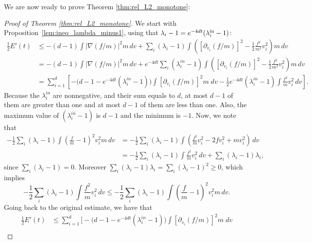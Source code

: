 \documentclass[11pt]{amsart}
\numberwithin{equation}{section}
\begin{document}
We are now ready to prove Theorem \ref{thm:rel_L2_monotone}: 

% 
\begin{proof}[Proof of Theorem \ref{thm:rel_L2_monotone}]
  We start with Proposition~\ref{lem:ineq_lambda_minus1}, using that $ \lambda_i-1 =e^{-4dt}(\lambda_i^\textnormal{in}-1)$:
  \begin{align*}
    \frac{1}{2}E'(t) & \leq
    -(d-1)\int\vert\nabla\left(f/ m \right)\vert^{2} m\,dv + 
    \sum_{i}(\lambda_{i}-1)\int\left(\left[\partial_{v_{i}}(f/ m )\right]^{2}-\frac{1}{2}\frac{f^{2}}{ m ^{2}}v_{i}^{2}\right) m\,dv\\
    & =  -(d-1)\int\vert\nabla\left(f/ m \right)\vert^{2} m\,dv + 
    e^{-4dt}\sum_{i}(\lambda_{i}^{in}-1)\int\left(\left[\partial_{v_{i}}(f/ m )\right]^{2}-\frac{1}{2}\frac{f^{2}}{ m ^{2}}v_{i}^{2}\right) m\,dv \\
     &=  \sum_{i=1}^d \left[ - \big(d-1-e^{-4dt}(\lambda_{i}^{in}-1)\big) \int \left[\partial_{v_{i}}(f/ m )\right]^{2}m\;dv  - \frac{1}{2}e^{-4dt}(\lambda_{i}^{in}-1) \int \frac{f^2}{m}v_i^2 \,dv\right].
  \end{align*}
 Because the $\lambda_i^{in}$ are nonnegative, and their sum equals to $d$, at most $d-1$ of them are greater than one and at most $d-1$ of them are less than one. Also, the maximum value of $(\lambda_i^{in}-1)$ is $d-1$ and the minimum is $-1$. Now, we note that
  \begin{align*}
    -\frac{1}{2}\sum_{i}(\lambda_{i}-1)\int\left(\frac{f}{m}-1\right)^{2}v_{i}^{2}m\,dv & =
    -\frac{1}{2}\sum_{i}(\lambda_{i}-1)\int\left(\frac{f^{2}}{m}v_{i}^{2}-2fv_{i}^{2}+mv_{i}^{2}\right)\,dv 	\\
    & =-\frac{1}{2}\sum_{i}(\lambda_{i}-1)\int\frac{f^{2}}{m}v_{i}^{2}\,dv+\sum_{i}(\lambda_{i}-1)\lambda_{i}, 
  \end{align*}
  since $\sum_i(\lambda_i-1)=0$. Moreover $\sum_{i}(\lambda_{i}-1)\lambda_{i} = \sum_{i}(\lambda_{i}-1)^2\geq 0$, which implies 
  $$
  -\frac{1}{2}\sum_{i}(\lambda_{i}-1)\int\frac{f^{2}}{m}v_{i}^{2}\,dv \le -\frac{1}{2}\sum_{i}(\lambda_{i}-1)\int\left(\frac{f}{m}-1\right)^{2}v_{i}^{2}m \,dv.
  $$
  Going back to the original estimate, we have that 
  \begin{align}
    \frac{1}{2}E'(t) & 
    \leq \sum_{i=1}^d\Bigg[ - \big(d-1-e^{-4dt}(\lambda_{i}^{in}-1)\big) \int \left[\partial_{v_{i}}(f/ m )\right]^{2}m\;dv\nonumber	\\

\end{align}
\end{proof}
\end{document}
